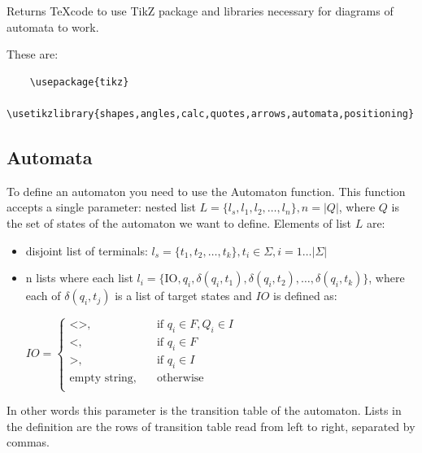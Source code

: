 \documentclass{ctuthesis}
\begin{document}
Returns \TeX code to use TikZ package and libraries necessary for diagrams of automata to work.

These are:
\begin{verbatim}
	\usepackage{tikz}
	\usetikzlibrary{shapes,angles,calc,quotes,arrows,automata,positioning}
\end{verbatim}

\subsection{Automata}
\label{subsec:automata-variables}
To define an automaton you need to use the Automaton function. This function accepts a single parameter: nested list $L = \{l_s, l_1, l_2, \ldots, l_n\}, n = |Q|$, where $Q$ is the set of states of the automaton we want to define.  Elements of list $L$ are:
\begin{itemize}
	\item disjoint list of terminals: $l_s = \{t_1, t_2, \ldots, t_k\}, t_i \in \Sigma, i = 1\ldots |\Sigma|$
	\item n lists where each list $l_i = \{\text{IO}, q_i, \delta(q_i, t_1), \delta(q_i, t_2), \ldots, \delta(q_i, t_k)\}$, where each of $\delta(q_i, t_j)$ is a list of target states and $IO$ is defined as: 
 	
	$IO = 
		\begin{cases}
			\text{<>,} &\quad\text{if }q_i \in F, Q_i \in I \\
			\text{<,} &\quad\text{if }q_i \in F\\
			\text{>,} &\quad\text{if }q_i \in I \\
			\text{empty string,} &\quad\text{otherwise}\\
		\end{cases}$
\end{itemize}

In other words this parameter is the transition table of the automaton. Lists in the definition are the rows of transition table read from left to right, separated by commas.
\end{document}
